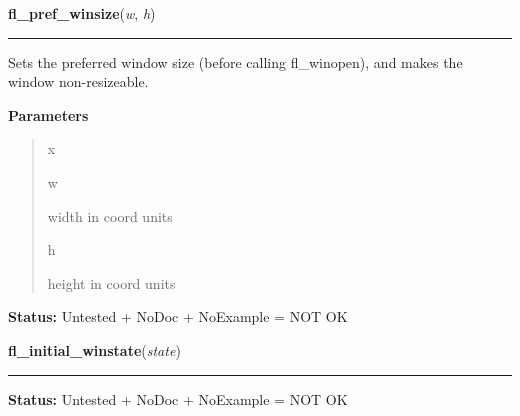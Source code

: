 \hspace{.8\funcindent}\begin{boxedminipage}{\funcwidth}

    \raggedright \textbf{fl\_pref\_winsize}(\textit{w}, \textit{h})

    \vspace{-1.5ex}

    \rule{\textwidth}{0.5\fboxrule}
\setlength{\parskip}{2ex}
    Sets the preferred window size (before calling fl\_winopen), and makes 
    the window non-resizeable.

\setlength{\parskip}{1ex}
      \textbf{Parameters}
      \vspace{-1ex}

      \begin{quote}
        \begin{Ventry}{x}

          \item[w]

          width in coord units

          \item[h]

          height in coord units

        \end{Ventry}

      \end{quote}

\textbf{Status:} Untested + NoDoc + NoExample = NOT OK



    \end{boxedminipage}

    \label{xformslib:library:fl_initial_winstate}

    \vspace{0.5ex}

\hspace{.8\funcindent}\begin{boxedminipage}{\funcwidth}

    \raggedright \textbf{fl\_initial\_winstate}(\textit{state})

    \vspace{-1.5ex}

    \rule{\textwidth}{0.5\fboxrule}
\setlength{\parskip}{2ex}
\setlength{\parskip}{1ex}
\textbf{Status:} Untested + NoDoc + NoExample = NOT OK



    \end{boxedminipage}

